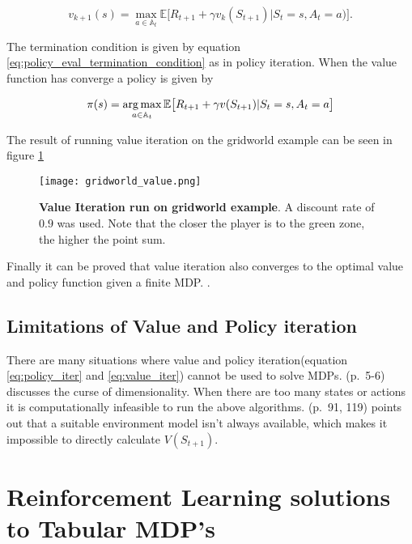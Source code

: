 \begin{equation}
    v_{k+1}(s) = \max_{a \in \mathbb{A}_t} \mathbb{E}\big[R_{t+1} + \gamma v_{k}(S_{t+1})|S_t = s, A_t = a)\big].
    \label{eq:value_iter}
\end{equation}

The termination condition is given by equation \ref{eq:policy_eval_termination_condition} as in policy iteration. When the value function has converge a policy is given by

\begin{equation}
    \pi(s) = \operatorname*{arg\,max}_{a\in \mathbb{A}_t} \mathbb{E}\big[R_{t+1} + \gamma v(S_{t+1})|S_t=s, A_t=a\big]
\end{equation}

The result of running value iteration on the gridworld example can be seen in figure \ref{fig:value_it}

\begin{figure}[H]
\centering
\texttt{[image: gridworld\_value.png]}
\captionsetup{width=.7\linewidth}
\caption{\textbf{Value Iteration run on gridworld example}. A discount rate of $0.9$ was used. Note that the closer the player is to the green zone, the higher the point sum.}
\label{fig:value_it}
\end{figure}

Finally it can be proved that value iteration also converges to the optimal value and policy function given a finite MDP. \citep[p.~89-93]{powell_2011}.

\subsection{Limitations of Value and Policy iteration}

There are many situations where value and policy iteration(equation \ref{eq:policy_iter} and \ref{eq:value_iter}) cannot be used to solve MDPs. \cite{powell_2011} (p.~5-6) discusses the curse of dimensionality. When there are too many states or actions it is computationally infeasible to run the above algorithms. \cite{sutton_barto_2018} (p.~91, 119) points out that a suitable environment model isn't always available, which makes it impossible to directly calculate $V(S_{t+1})$.

\section{Reinforcement Learning solutions to Tabular MDP's}

